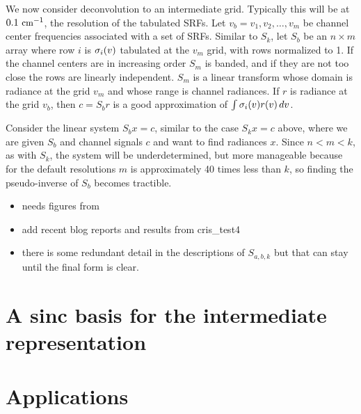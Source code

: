 \documentclass[11pt]{article}
\begin{document}
We now consider deconvolution to an intermediate grid.  Typically
this will be at $0.1\ \mbox{\small cm}^{-1}$, the resolution of the tabulated SRFs.
Let $v_b = v_1,v_2,\ldots,v_m$ be channel center frequencies
associated with a set of SRFs.  Similar to $S_k$, let $S_b$ be an
$n\times m$ array where row $i$ is $\sigma_i(v)$ tabulated at the
$v_m$ grid, with rows normalized to 1.  If the channel centers are
in increasing order $S_m$ is banded, and if they are not too close
the rows are linearly independent.  $S_m$ is a linear transform
whose domain is radiance at the grid $v_m$ and whose range is
channel radiances.  If $r$ is radiance at the grid $v_b$, then $c =
S_b r$ is a good approximation of $\int\sigma_i(v)r(v)\,dv$.

Consider the linear system $S_b x = c$, similar to the case $S_k x =
c$ above, where we are given $S_b$ and channel signals $c$ and want
to find radiances $x$.  Since $n < m < k$, as with $S_k$, the system
will be underdetermined, but more manageable because for the default
resolutions $m$ is approximately 40 times less than $k$, so finding
the pseudo-inverse of $S_b$ becomes tractible.

\begin{itemize}
  \item needs figures from 
  \item add recent blog reports and results from cris\_test4
  \item there is some redundant detail in the descriptions of
    $S_{a,b,k}$ but that can stay until the final form is clear.
\end{itemize}

\section{A sinc basis for the intermediate representation}

\section{Applications}
\end{document}
